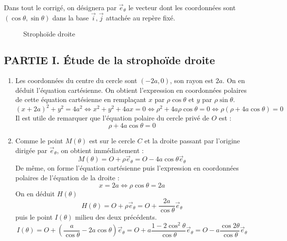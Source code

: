 Dans tout le corrigé, on désignera par $\overrightarrow{e}_\theta$ le vecteur dont les coordonnées sont $(\cos \theta , \sin \theta)$ dans la base $\overrightarrow{i},\overrightarrow{j}$ attachée au repère fixé.
\begin{figure}[ht]
 \centering
 
 \caption{Stropho{\"i}de droite}
 \label{fig:Ccubcirc_1} 
\end{figure}

\subsection*{PARTIE I. \'Etude de la stropho{\"i}de droite}
\begin{enumerate}
 \item Les coordonnées du centre du cercle sont $(-2a, 0)$, son rayon est $2a$. On en déduit l'équation cartésienne. On obtient l'expression en coordonnées polaires de cette équation cartésienne en remplaçant $x$ par $\rho \cos \theta$ et $y$ par $\rho \sin \theta$.
\begin{displaymath}
 (x+2a)^2+y^2 = 4a^2 \Leftrightarrow x^2+y^2+4ax=0
\Leftrightarrow \rho^2 + 4a\rho \cos \theta =0 
\Leftrightarrow \rho(\rho + 4a \cos \theta) =0 
\end{displaymath}
Il est utile de remarquer que l'équation polaire du cercle privé de $O$ est :
\begin{displaymath}
 \rho + 4a \cos \theta =0
\end{displaymath}
\item Comme le point $M(\theta)$ est sur le cercle $C$ et la droite passant par l'origine dirigée par $\overrightarrow{e}_\theta$, on obtient immédiatement :
\begin{displaymath}
 M(\theta) = O +\rho \overrightarrow{e}_\theta
= O  -4a\cos \theta \overrightarrow{e}_\theta
\end{displaymath}
De même, on forme l'équation cartésienne puis l'expression en coordonnées polaires de l'équation de la droite :
\begin{displaymath}
 x=2a \Leftrightarrow \rho \cos \theta =2a
\end{displaymath}
On en déduit $H(\theta)$
\begin{displaymath}
 H(\theta) = O +\rho \overrightarrow{e}_\theta
= O  +\dfrac{2a}{\cos \theta} \overrightarrow{e}_\theta
\end{displaymath}
puis le point $I(\theta)$ milieu des deux précédents.
\begin{displaymath}
 I(\theta)=O + \left( \dfrac{a}{\cos \theta} -2a\cos \theta \right)\overrightarrow{e}_\theta 
= O + a \dfrac{1-2\cos^2 \theta}{\cos \theta}\overrightarrow{e}_\theta 
= O - a \dfrac{\cos 2\theta}{\cos \theta}\overrightarrow{e}_\theta 
\end{displaymath}


\end{enumerate}
